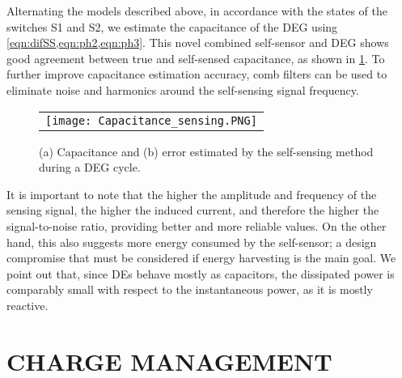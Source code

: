 Alternating the models described above, in accordance with the states of the switches S1 and S2, we estimate the capacitance of the DEG using \ref{eqn:difSS,eqn:ph2,eqn:ph3}. This novel combined self-sensor and DEG shows good agreement between true and self-sensed capacitance, as shown in \ref{fig:capacitance}. To further improve capacitance estimation accuracy, comb filters can be used to eliminate noise and harmonics around the self-sensing signal frequency. 
\begin{figure} [ht]
   \begin{center}
   \begin{tabular}{c} %
   \texttt{[image: Capacitance\_sensing.PNG]}
   \end{tabular}
   \end{center}
   \caption[example] 
   { \label{fig:capacitance} 
(a) Capacitance and (b) error estimated by the self-sensing method during a DEG cycle.}
   \end{figure} 
    
   It is important to note that the higher the amplitude and frequency of the sensing signal, the higher the induced current, and therefore the higher the signal-to-noise ratio, providing better and more reliable values. On the other hand, this also suggests more energy consumed by the self-sensor; a design compromise that must be considered if energy harvesting is the main goal. We point out that, since DEs behave mostly as capacitors, the dissipated power is comparably small with respect to the instantaneous power, as it is mostly reactive\cite{rizzelloOEA}.



\section{CHARGE MANAGEMENT}

